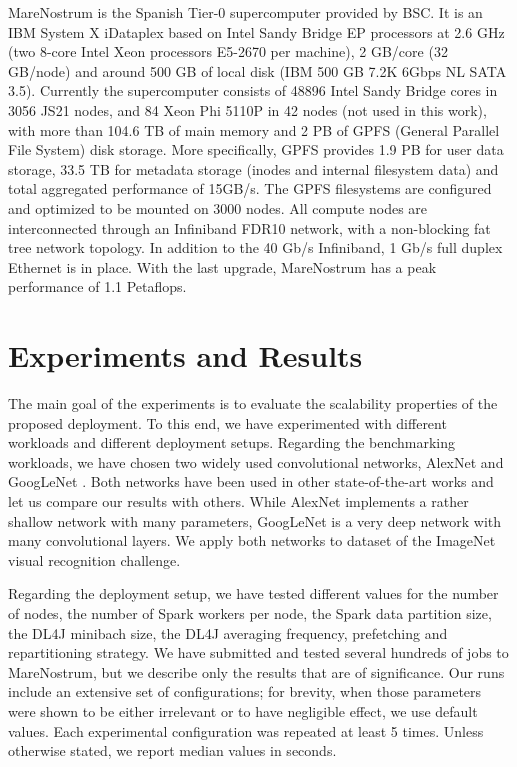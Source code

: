 \documentclass[journal]{IEEEtran}
\begin{document}
MareNostrum is the Spanish Tier-0 supercomputer provided by BSC. It is an IBM System X iDataplex based on Intel Sandy Bridge EP processors at 2.6 GHz (two 8-core Intel Xeon processors E5-2670 per machine), 2 GB/core (32 GB/node) and around 500 GB of local disk (IBM 500 GB  7.2K 6Gbps NL SATA 3.5). Currently the supercomputer consists of 48896 Intel Sandy Bridge cores in 3056 JS21 nodes, and 84 Xeon Phi 5110P in 42 nodes (not used in this work), with more than 104.6 TB of main memory and 2 PB of GPFS (General Parallel File System) disk storage. More specifically, GPFS provides 1.9 PB for user data storage,
33.5 TB for metadata storage (inodes and internal filesystem data) and total aggregated performance of 15GB/s.
The GPFS filesystems are configured and optimized to be mounted on 3000 nodes.
All compute nodes are interconnected through an Infiniband FDR10 network, with a non-blocking fat tree network topology. In addition to the  40 Gb/s Infiniband, 1 Gb/s full duplex Ethernet is in place.
With the last upgrade,  MareNostrum has a peak performance of 1.1 Petaflops.

\section{Experiments and Results}

The main goal of the experiments is to evaluate the scalability properties of the proposed deployment. To this end, we have experimented with different workloads and different deployment setups. Regarding the benchmarking workloads, we have chosen two widely used convolutional networks, AlexNet \cite{DBLP:journals/cacm/KrizhevskySH17} and GoogLeNet \cite{DBLP:conf/cvpr/SzegedyLJSRAEVR15}. Both networks have been used in other state-of-the-art works and let us compare our results with others. While AlexNet implements a rather shallow network with many parameters, GoogLeNet is a very deep network with many convolutional layers. We apply both networks to dataset of the ImageNet \cite{DBLP:journals/ijcv/RussakovskyDSKS15} visual recognition challenge. 

Regarding the deployment setup, we have tested different values for the number of nodes, the number of Spark workers per node, the Spark data partition size, the DL4J minibach size, the DL4J averaging frequency, prefetching and repartitioning strategy. We have submitted and tested several hundreds of jobs to MareNostrum, but we describe only the results that are of significance. Our runs include an extensive  set of configurations; for brevity, when those parameters were shown to be either irrelevant or to have negligible effect, we use default values. Each experimental configuration was repeated at least 5 times. Unless otherwise stated, we report median values in seconds. 
\end{document}
